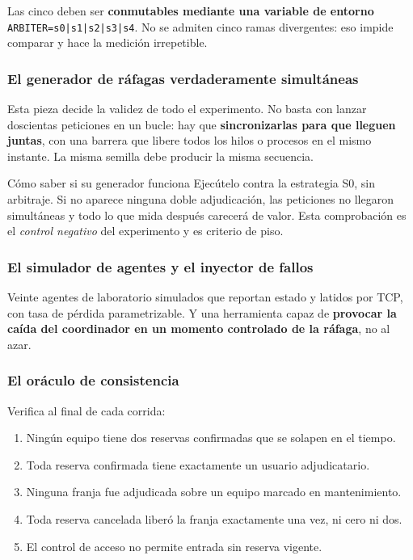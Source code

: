 \documentclass[11pt,a4paper]{article}
\begin{document}
	Las cinco deben ser \textbf{conmutables mediante una variable de entorno} \texttt{ARBITER=s0|s1|s2|s3|s4}. No se admiten cinco ramas divergentes: eso impide comparar y hace la medición irrepetible.
	
	\subsubsection{El generador de ráfagas verdaderamente simultáneas}
	
	Esta pieza decide la validez de todo el experimento. No basta con lanzar doscientas peticiones en un bucle: hay que \textbf{sincronizarlas para que lleguen juntas}, con una barrera que libere todos los hilos o procesos en el mismo instante. La misma semilla debe producir la misma secuencia.
	
	\begin{avisoBox}{Cómo saber si su generador funciona}
		Ejecútelo contra la estrategia S0, sin arbitraje. Si no aparece ninguna doble adjudicación, las peticiones no llegaron simultáneas y todo lo que mida después carecerá de valor. Esta comprobación es el \emph{control negativo} del experimento y es criterio de piso.
	\end{avisoBox}
	
	\subsubsection{El simulador de agentes y el inyector de fallos}
	
	Veinte agentes de laboratorio simulados que reportan estado y latidos por TCP, con tasa de pérdida parametrizable. Y una herramienta capaz de \textbf{provocar la caída del coordinador en un momento controlado de la ráfaga}, no al azar.
	
	\subsubsection{El oráculo de consistencia}
	
	Verifica al final de cada corrida:
	
	\begin{enumerate}[leftmargin=*,itemsep=2pt]
		\item Ningún equipo tiene dos reservas confirmadas que se solapen en el tiempo.
		\item Toda reserva confirmada tiene exactamente un usuario adjudicatario.
		\item Ninguna franja fue adjudicada sobre un equipo marcado en mantenimiento.
		\item Toda reserva cancelada liberó la franja exactamente una vez, ni cero ni dos.
		\item El control de acceso no permite entrada sin reserva vigente.
	\end{enumerate}
	
\end{document}
